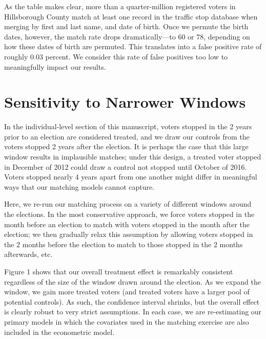\documentclass[
  12pt,
]{article}
\begin{document}
As the table makes clear, more than a quarter-million registered voters in Hillsborough County match at least one record in the traffic stop database when merging by first and last name, and date of birth. Once we permute the birth dates, however, the match rate drops dramatically---to 60 or 78, depending on how these dates of birth are permuted. This translates into a false positive rate of roughly 0.03 percent. We consider this rate of false positives too low to meaningfully impact our results.

\hypertarget{sensitivity-to-narrower-windows}{%
\section*{Sensitivity to Narrower Windows}\label{sensitivity-to-narrower-windows}}

In the individual-level section of this manuscript, voters stopped in the 2 years prior to an election are considered treated, and we draw our controls from the voters stopped 2 years after the election. It is perhaps the case that this large window results in implausible matches; under this design, a treated voter stopped in December of 2012 could draw a control not stopped until October of 2016. Voters stopped nearly 4 years apart from one another might differ in meaningful ways that our matching models cannot capture.

Here, we re-run our matching process on a variety of different windows around the elections. In the most conservative approach, we force voters stopped in the month before an election to match with voters stopped in the month after the election; we then gradually relax this assumption by allowing voters stopped in the 2 months before the election to match to those stopped in the 2 months afterwards, etc.

Figure 1 shows that our overall treatment effect is remarkably consistent regardless of the size of the window drawn around the election. As we expand the window, we gain more treated voters (and treated voters have a larger pool of potential controls). As such, the confidence interval shrinks, but the overall effect is clearly robust to very strict assumptions. In each case, we are re-estimating our primary models in which the covariates used in the matching exercise are also included in the econometric model.
\end{document}
